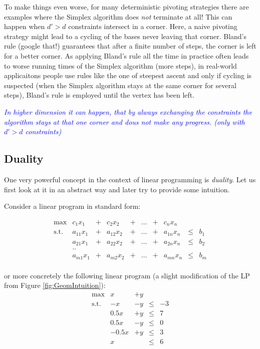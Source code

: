 \documentclass{article}
\begin{document}
To make things even worse, for many deterministic pivoting strategies there are examples where the Simplex algorithm does \emph{not} terminate at all! This can happen when $d'>d$ constraints intersect in a corner. Here, a naive pivoting strategy might lead to a cycling of the bases never leaving that corner. Bland's rule (google that!) guarantees that after a finite number of steps, the corner is left for a better corner. As applying Bland's rule all the time in practice often leads to worse running times of the Simplex algorithm (more steps), in real-world applicaitons people use rules like the one of steepest ascent and only if cycling is suspected (when the Simplex algorithm stays at the same corner for several steps), Bland's rule is employed until the vertex has been left.

\textcolor{blue}{\emph{In higher dimension it can happen, that by always exchanging the constraints the algorithm stays at that one corner and dous not make any progress. (only with $d'>d$ constraints)}}

\subsection{Duality}
One very powerful concept in the context of linear programming is \emph{duality}. Let us first look at it in an abstract way and later try to provide some intuition.

Consider a linear program in standard form:

\[
\begin{matrix}
	\max	& c_1 x_1 &+& c_2 x_2 &+& \dots &+& c_n x_n&&\\  
	\mbox{s.t.}	& a_{11} x_1 &+& a_{12} x_2&+& \dots &+&a_{1n} x_n&\leq&b_1\\
			& a_{21} x_1 &+& a_{22} x_2&+& \dots &+&a_{2n} x_n&\leq&b_2\\
			& ..	&&&&&&&&\\
			& a_{m1} x_1 &+& a_{m2} x_2&+& \dots &+&a_{mn} x_n&\leq&b_m\\
\end{matrix}
\]

or more concretely the following linear program (a slight modification of the LP from Figure \ref{fig:GeomIntuition}):
\[
\begin{matrix}
	\max		& x	&+	y	&&\\ 
	\mbox{s.t.}	&-x	&	-y	&\leq&-3\\ 
			&0.5x	&	+y	&\leq&7\\ 
			&0.5x	&	-y	& \leq&0\\
			&-0.5x	&	+y	& \leq&3\\
			&	x	&		& \leq&6\\
\end{matrix}
\]
\end{document}
